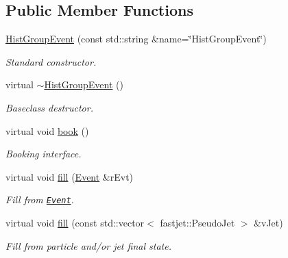 \subsection*{Public Member Functions}
\begin{CompactItemize}
\item 
\hypertarget{classHistGroupEvent_23868699c95a6abfa18b7b78e8291302}{
\hyperlink{classHistGroupEvent_23868699c95a6abfa18b7b78e8291302}{Hist\-Group\-Event} (const std::string \&name=\char`\"{}Hist\-Group\-Event\char`\"{})}
\label{classHistGroupEvent_23868699c95a6abfa18b7b78e8291302}

\begin{CompactList}\small\item\em Standard constructor. \item\end{CompactList}\item 
\hypertarget{classHistGroupEvent_509193806620f53d830505e962807e01}{
virtual \hyperlink{classHistGroupEvent_509193806620f53d830505e962807e01}{$\sim$Hist\-Group\-Event} ()}
\label{classHistGroupEvent_509193806620f53d830505e962807e01}

\begin{CompactList}\small\item\em Baseclass destructor. \item\end{CompactList}\item 
\hypertarget{classHistGroupEvent_39b41fc976e2361782852cc96ee22c65}{
virtual void \hyperlink{classHistGroupEvent_39b41fc976e2361782852cc96ee22c65}{book} ()}
\label{classHistGroupEvent_39b41fc976e2361782852cc96ee22c65}

\begin{CompactList}\small\item\em Booking interface. \item\end{CompactList}\item 
virtual void \hyperlink{classHistGroupEvent_78f86b37c41ad91e5d14cfd082e64658}{fill} (\hyperlink{classEvent}{Event} \&r\-Evt)
\begin{CompactList}\small\item\em Fill from {\tt \hyperlink{classEvent}{Event}}. \item\end{CompactList}\item 
virtual void \hyperlink{classHistGroupEvent_7cdf3dd95af609b72fa981a389a21070}{fill} (const std::vector$<$ fastjet::Pseudo\-Jet $>$ \&v\-Jet)
\begin{CompactList}\small\item\em Fill from particle and/or jet final state. \item\end{CompactList}\end{CompactItemize}
